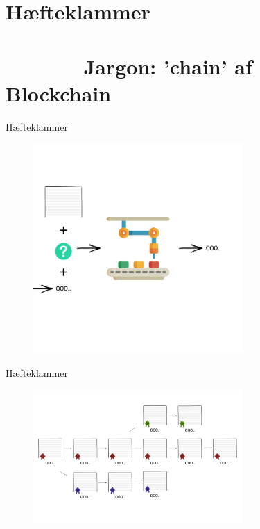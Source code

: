 \documentclass[usenames, dvipsnames]{beamer}
\begin{document}
  \section{Hæfteklammer \ \ \ \ \ \ \ \ \ \ \ \ \ \ \ \ \ \ \ \ \ \ \ \ \ \ \ \ \ \ \ \ \ \ \ \ \ \ \small Jargon: 'chain' af Blockchain}
  \begin{frame}{Hæfteklammer}
    \begin{figure}[ht!]
    \centering
    \includegraphics[width=80mm]{images/magic_machine_blockchain.png}
    \end{figure}
  \end{frame}
  \begin{frame}{Hæfteklammer}
    \begin{figure}[ht!]
    \centering
    \includegraphics[width=80mm]{images/honest_chain.png}
    \end{figure}
  \end{frame}
\end{document}
